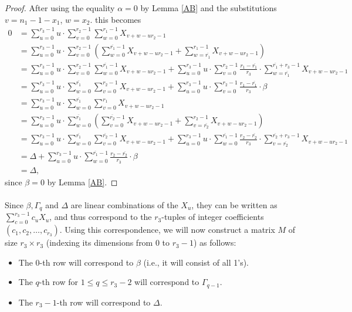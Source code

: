 \documentclass[12pt,a4paper]{article}
\theoremstyle{definition}
\newcommand{\uo}{\overline{r_2}}
\newcommand{\vo}{\overline{r_1}}
\begin{document}
\begin{proof}
After using the equality $\alpha=0$ by Lemma \ref{AB} and the substitutions $v=n_1-1-x_1$, $w=x_2$. this becomes
\begin{align*}
0&=\sum_{u=0}^{r_3-1}u\cdot \sum_{v=0}^{r_2-1}\sum _{w=0}^{r_1-1}X_{v+w-ur_2-1}\\
&=\sum_{u=0}^{r_3-1}u\cdot \sum_{v=0}^{r_2-1}\left(\sum _{w=0}^{\vo-1}X_{v+w-ur_2-1}+\sum _{w=\vo}^{r_1-1}X_{v+w-ur_2-1}\right)\\
&=\sum_{u=0}^{r_3-1}u\cdot \sum_{v=0}^{r_2-1}\sum _{w=0}^{\vo-1}X_{v+w-ur_2-1}+\sum_{u=0}^{r_3-1}u\cdot \sum_{v=0}^{r_2-1}\frac{r_1-\vo}{r_3}\cdot\sum _{w=\vo}^{\vo + r_3-1}X_{v+w-ur_2-1}\\
&=\sum_{u=0}^{r_3-1}u\cdot \sum _{w=0}^{\vo} \sum_{v=0}^{r_2-1} X_{v+w-ur_2-1}+\sum_{u=0}^{r_3-1}u\cdot \sum_{v=0}^{r_2-1}\frac{r_1-\vo}{r_3}\cdot \beta\\
&=\sum_{u=0}^{r_3-1}u\cdot \sum _{w=0}^{\vo} \sum_{v=0}^{r_1} X_{v+w-ur_2-1}\\
&=\sum_{u=0}^{r_3-1}u\cdot \sum _{w=0}^{\vo}\left( \sum_{v=0}^{\uo-1} X_{v+w-ur_2-1}+\sum_{v=\uo}^{r_2-1} X_{v+w-ur_2-1}\right)\\
&=\sum_{u=0}^{r_3-1}u\cdot \sum _{w=0}^{\vo} \sum_{v=0}^{\uo-1} X_{v+w-ur_2-1}+\sum_{u=0}^{r_3-1}u\cdot \sum _{w=0}^{\vo-1}\frac{r_2-\uo}{r_3}\cdot \sum_{v=\uo}^{\uo+r_3-1} X_{v+w-ur_2-1}\\
&=\Delta+\sum_{u=0}^{r_3-1}u\cdot \sum _{w=0}^{\vo-1}\frac{r_2-\uo}{r_3}\cdot \beta\\
&=\Delta,
\end{align*}
since $\beta=0$ by Lemma \ref{AB}.
\end{proof}

\paragraph*{}
Since $\beta,\Gamma_q$ and $\Delta$ are linear combinations of the $X_u$, they can be written as $\sum_{c=0}^{r_3-1}c_uX_u$, and thus correspond to the $r_3$-tuples of integer coefficients $(c_1,c_2,\dots,c_{r_3})$. Using this correspondence, we will now construct a matrix $M$ of size $r_3\times r_3$ (indexing its dimensions from $0$ to $r_3-1$) as follows:
\begin{itemize}
\item The $0$-th row will correspond to $\beta$ (i.e., it will consist of all 1's).
\item The $q$-th row for $1\leq q\leq r_3-2$ will correspond to $\Gamma_{q-1}$.
\item The $r_3-1$-th row will correspond to $\Delta$.
\end{itemize}
\end{document}
